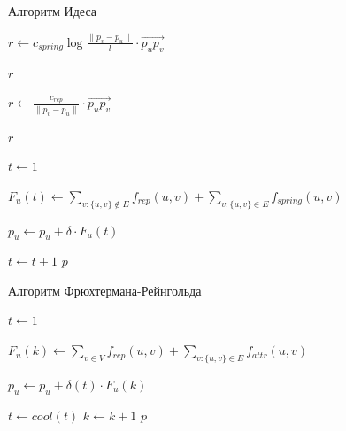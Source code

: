 \documentclass{beamer}
\begin{document}
\begin{frame}{Алгоритм Идеса}
	\begin{algorithm}[H]
    \caption{Алгоритм Идеса}
    \begin{algorithmic}[1]
			{\ttfamily \small{
					\State $r \gets c_{spring}\log{\frac{\|p_v - p_u \|}{l}}  \cdot \overrightarrow{p_u p_v}$

					\Return $r$
					\EndFunction


					\State $r \gets \frac{c_{rep}}{\|p_v - p_u \|} \cdot \overrightarrow{p_u p_v}  $

					\Return $r$
					\EndFunction


					\State $t \gets 1$

					\State $F_{u}(t) \gets \sum_{v:\{u,v\} \notin E}{f_{rep}(u, v)} + \sum_{v:\{u,v\} \in E}{f_{spring}(u, v)}$


					\EndFor
					\State $p_u \gets p_u + \delta \cdot F_u(t)$
					\EndFor

					\State $t \gets t + 1$
					\EndWhile
					\Return $p$
					\EndFunction

				}}

		\end{algorithmic}
	\end{algorithm}
\end{frame}
\begin{frame}{Алгоритм Фрюхтермана-Рейнгольда}
	\begin{algorithm}[H]
		\caption{Основной алгоритм}
    \begin{algorithmic}[1]

			{\ttfamily \small{
					\State $t \gets 1$

					\State $F_{u}(k) \gets \sum_{v \in V}{f_{rep}(u, v)} + \sum_{v:\{u,v\} \in E}{f_{attr}(u, v)}$


					\EndFor
					\State $p_u \gets p_u + \delta(t) \cdot F_u(k)$
					\EndFor

					\State $t \gets cool(t)$
					\State $k \gets k + 1$
					\EndWhile
					\Return $p$
					\EndFunction
				}}

		\end{algorithmic}
	\end{algorithm}
\end{frame}
\end{document}

